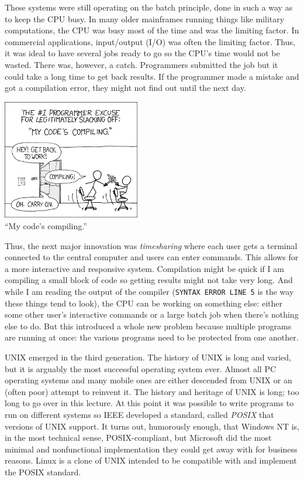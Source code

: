 These systems were still operating on the batch principle, done in such a way as to keep the CPU busy. In many older mainframes running things like military computations, the CPU was busy most of the time and was the limiting factor. In commercial applications, input/output (I/O) was often the limiting factor. Thus, it was ideal to have several jobs ready to go so the CPU's time would not be wasted. There was, however, a catch. Programmers submitted the job but it could take a long time to get back results. If the programmer made a mistake and got a compilation error, they might not find out until the next day. 

\begin{center}
\includegraphics[width=0.45\textwidth]{images/compiling.png}\\
``My code's compiling.'' ~\cite{xkcd:compiling}
\end{center}

Thus, the next major innovation was \textit{timesharing} where each user gets a terminal connected to the central computer and users can enter commands. This allows for a more interactive and responsive system. Compilation might be quick if I am compiling a small block of code so getting results might not take very long. And while I am reading the output of the compiler (\texttt{SYNTAX ERROR LINE 5} is the way these things tend to look), the CPU can be working on something else: either some other user's interactive commands or a large batch job when there's nothing else to do. But this introduced a whole new problem because multiple programs are running at once: the various programs need to be protected from one another.

UNIX emerged in the third generation. The history of UNIX is long and varied, but it is arguably the most successful operating system ever. Almost all PC operating systems and many mobile ones are either descended from UNIX or an (often poor) attempt to reinvent it. The history and heritage of UNIX is long; too long to go over in this lecture. At this point it was possible to write programs to run on different systems so IEEE developed a standard, called \textit{POSIX} that versions of UNIX support. It turns out, humorously enough, that Windows NT is, in the most technical sense, POSIX-compliant, but Microsoft did the most minimal and nonfunctional implementation they could get away with for business reasons. Linux is a clone of UNIX intended to be compatible with and implement the POSIX standard.

